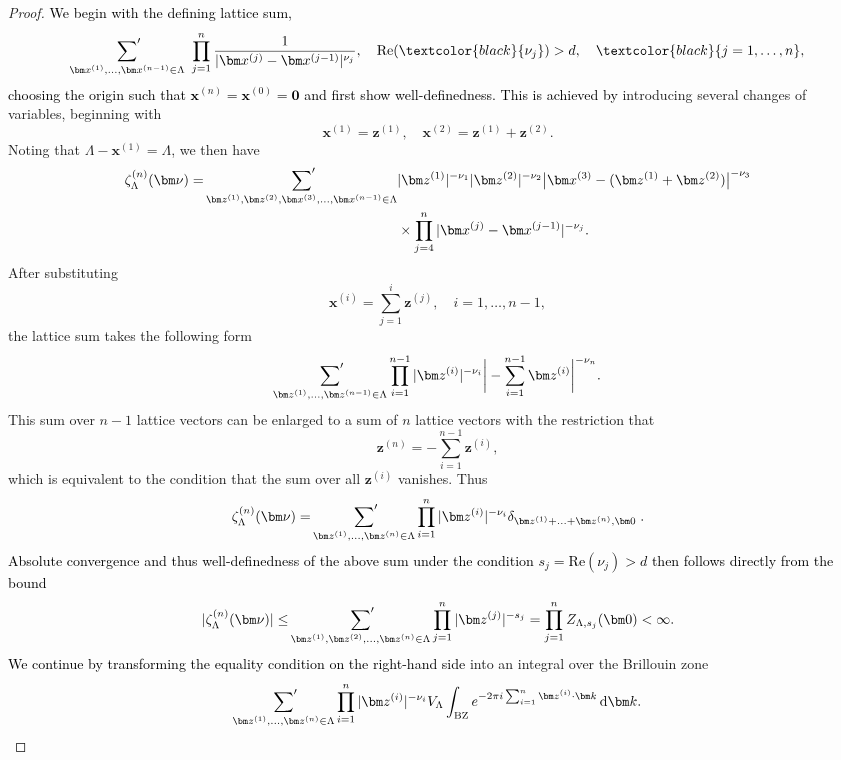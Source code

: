 \documentclass[]{amsart}
\numberwithin{mythm}{section}
\newcommand{\new}[1]{{\textcolor{black}{#1}}}
\begin{document}
\begin{proof}
    \new{We begin with the defining lattice sum, \[\sideset{}{'}\sum_{\bm x^{(1)},\dots, \bm x^{(n-1)} \in \Lambda}~  \prod_{j=1}^{n} \frac{1}{\vert \bm x^{(j)}-\bm x^{(j-1)} \vert^{\nu_j}},\quad \mathrm{Re}(\new{\nu_j})>d,\quad \new{j=1,\dots,n},\] choosing the origin such that $\bm x^{(n)} = \bm x^{(0)} = \bm 0$ and first show well-definedness.} \new{This is achieved by} introducing several changes of variables, beginning with
    \[
    \bm x^{(1)}=\bm z^{(1)}, \quad \bm x^{(2)}= \bm z^{(1)}+\bm z^{(2)}.
    \]
    Noting that $\Lambda-\bm x^{(1)}=\Lambda$, we then have 
    \begin{align*}
    \zeta_\Lambda^{(n)}(\bm \nu) = \sideset{}{'}\sum_{\bm z^{(1)},\bm z^{(2)},\bm x^{(3)},\dots, \bm x^{(n-1)} \in \Lambda} &\vert \bm z^{(1)} \vert^{-\nu_1} \vert \bm z^{(2)} \vert^{-\nu_2} \big \vert \bm x^{(3)}-(\bm z^{(1)}+\bm z^{(2)}) \big\vert^{-\nu_3}\\ &\times \prod_{j=4}^{n}\vert \bm x^{(j)}-\bm x^{(j-1)} \vert^{-\nu_j}.
    \end{align*}
    After substituting
    \[
    \bm x^{(i)}= \sum_{j=1}^i\bm z^{(j)},\quad i=1,\dots, n-1,
    \]
    the lattice sum takes the following form
    \[
    \sideset{}{'}\sum_{\bm z^{(1)},\dots,\bm z^{(n-1)} \in \Lambda} \prod_{i=1}^{n-1}\vert \bm z^{(i)} \vert^{-\nu_i} \bigg\vert -\sum_{i=1}^{n-1} \bm z^{(i)}\bigg\vert^{-\nu_n}.
    \]
    This sum over $n-1$ lattice vectors can be enlarged to a sum of $n$ lattice vectors with the restriction that 
    \[
    \bm z^{(n)} = -\sum_{i=1}^{n-1} \bm z^{(i)},
    \]
    which is equivalent to the condition that the sum over all $\bm z^{(i)}$ vanishes.
    Thus
    \[
    \zeta_\Lambda^{(n)}(\bm \nu) = \sideset{}{'}\sum_{\bm z^{(1)},\dots,\bm z^{(n)} \in \Lambda} \prod_{i=1}^n \vert \bm z^{(i)}\vert^{-\nu_i}
     \delta_{\bm z^{(1)}+\ldots+\bm z^{(n)},\bm 0}
    \;.
    \]
    \new{Absolute convergence and thus well-definedness of the above sum under the condition $s_j=\mathrm{Re}(\nu_j)>d$ then follows directly from the bound
    \[
   |\zeta_\Lambda^{(n)}(\bm \nu)| \le \sideset{}{'}\sum_{\bm z^{(1)},\bm z^{(2)},\dots, \bm z^{(n)} \in \Lambda}\prod_{j=1}^{n} \vert \bm z^{(j)} \vert^{-s_j} =\prod_{j=1}^{n} Z_{\Lambda,s_j}(\bm 0)<\infty.\]} \new{We continue by transforming the equality condition on the right-hand side} into an integral over the Brillouin zone
    \[
     \sideset{}{'}\sum_{\bm z^{(1)},\dots,\bm z^{(n)} \in \Lambda} \prod_{i=1}^n \vert \bm z^{(i)}\vert^{-\nu_i} V_\Lambda \int_\mathrm{BZ} e^{-2\pi i \sum_{i=1}^n \bm z^{(i)}\cdot \bm k } \,\mathrm d\bm k.
    \]
    

\end{proof}
\end{document}
